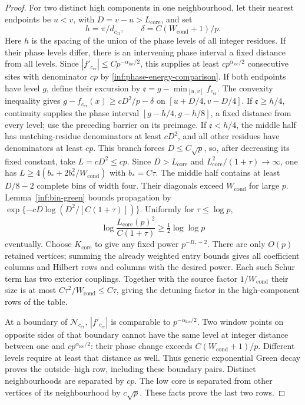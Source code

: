 \begin{proof}
For two distinct high components in one neighbourhood, let their
nearest endpoints be $u<v$, with $D=v-u>L_{\mathrm{core}}$, and set
\[
 h=\pi/d_{c_{\mathrm{cr}}},\qquad
 \delta=C(W_{\mathrm{cond}}+1)/p.
\]
Here $h$ is the spacing of the union of the phase levels of all
integer residues. If their phase levels differ,
there is an intervening phase interval a fixed distance from all
levels. Since $|f'_{c_{\mathrm{cr}}}|\le Cp^{-\alpha_{\mathrm{loc}}/2}$,
this supplies at least $cp^{\alpha_{\mathrm{loc}}/2}$ consecutive
sites with denominator $cp$ by
\eqref{inf:phase-energy-comparison}. If both endpoints have level
$g$, define their excursion by
$\mathfrak e=g-\min_{[u,v]}f_{c_{\mathrm{cr}}}$.
The convexity inequality gives
$g-f_{c_{\mathrm{cr}}}(x)\ge cD^2/p-\delta$
on $[u+D/4,v-D/4]$.
If $\mathfrak e\ge h/4$, continuity supplies the phase interval
$[g-h/4,g-h/8]$, a fixed distance from every level;
use the preceding barrier on its preimage.
If $\mathfrak e<h/4$, the middle half has matching-residue
denominators at least $cD^2$, and all other residues have
denominators at least $cp$. This branch forces $D\le C\sqrt p$,
so, after decreasing its fixed constant, take $L=cD^2\le cp$.
Since $D>L_{\mathrm{core}}$ and
$L_{\mathrm{core}}^2/(1+\tau)\to\infty$, one has
$L\ge4(b_*+2b_*^2/W_{\mathrm{cond}})$ with $b_*=C\tau$.
The middle half contains at least $D/8-2$ complete bins of width
four. Their diagonals exceed $W_{\mathrm{cond}}$ for large $p$.
Lemma~\ref{inf:bin-green} bounds propagation
by $\exp\{-cD\log(D^2/[C(1+\tau)])\}$.
Uniformly for $\tau\le\log p$,
\[
 \log\frac{L_{\mathrm{core}}(p)^2}{C(1+\tau)}
 \ge\tfrac12\log\log p
\]
eventually. Choose $K_{\mathrm{core}}$ to give any fixed power
$p^{-B_*-2}$. There are only $O(p)$ retained vertices; summing
the already weighted entry bounds gives all coefficient columns
and Hilbert rows and columns with the desired power.
Each such Schur term has two exterior couplings. Together with
the source factor $1/W_{\mathrm{cond}}$ their size is at most
$C\tau^2/W_{\mathrm{cond}}\le C\tau$, giving the detuning factor
in the high-component rows of the table.

At a boundary of $\mathcal N_{c_{\mathrm{cr}}}$, $|f'_{c_{\mathrm{cr}}}|$ is comparable to
$p^{-\alpha_{\mathrm{loc}}/2}$. Two window points on opposite
sides of that boundary cannot have the same level at integer
distance between one and $cp^{\alpha_{\mathrm{loc}}/2}$:
their phase change exceeds $C(W_{\mathrm{cond}}+1)/p$.
Different levels require at least that distance as well.
Thus generic exponential Green decay proves the outside--high
row, including these boundary pairs. Distinct neighbourhoods are
separated by $cp$. The low core is separated from other vertices
of its neighbourhood by $c\sqrt p$. These facts prove the last
two rows.


\end{proof}
